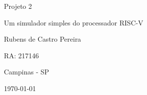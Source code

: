 \begin{titlepage}
\begin{center}
\vfill


{\fontsize{28}{\baselineskip}\selectfont
Projeto 2 
}

\vfill




{\fontsize{36}{\baselineskip}\selectfont
Um simulador simples do processador RISC-V
}

\vfill



{\fontsize{20}{\baselineskip}\selectfont
Rubens de Castro Pereira

RA: 217146
}


	
    
    
    
	
	
	

\vfill





{\fontsize{14}{\baselineskip}\selectfont
	Campinas - SP

	\today
}

\end{center}
\end{titlepage}